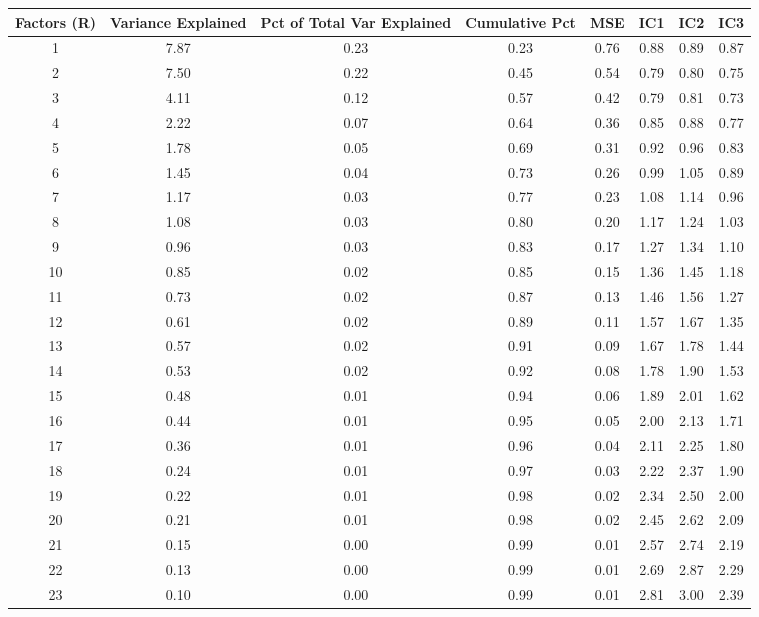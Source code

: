 \documentclass[11pt, letterpaper]{article}\usepackage[]{graphicx}\usepackage[]{color}
\begin{document}
\begin{table}[H]
\centering
\begingroup\scriptsize
\begin{tabular}{cccccccc}
  \hline
Factors (R) & Variance Explained & Pct of Total Var Explained & Cumulative Pct & MSE & IC1 & IC2 & IC3 \\ 
  \hline
  1 & 7.87 & 0.23 & 0.23 & 0.76 & 0.88 & 0.89 & 0.87 \\ 
    2 & 7.50 & 0.22 & 0.45 & 0.54 & 0.79 & 0.80 & 0.75 \\ 
    3 & 4.11 & 0.12 & 0.57 & 0.42 & 0.79 & 0.81 & 0.73 \\ 
    4 & 2.22 & 0.07 & 0.64 & 0.36 & 0.85 & 0.88 & 0.77 \\ 
    5 & 1.78 & 0.05 & 0.69 & 0.31 & 0.92 & 0.96 & 0.83 \\ 
    6 & 1.45 & 0.04 & 0.73 & 0.26 & 0.99 & 1.05 & 0.89 \\ 
    7 & 1.17 & 0.03 & 0.77 & 0.23 & 1.08 & 1.14 & 0.96 \\ 
    8 & 1.08 & 0.03 & 0.80 & 0.20 & 1.17 & 1.24 & 1.03 \\ 
    9 & 0.96 & 0.03 & 0.83 & 0.17 & 1.27 & 1.34 & 1.10 \\ 
   10 & 0.85 & 0.02 & 0.85 & 0.15 & 1.36 & 1.45 & 1.18 \\ 
   11 & 0.73 & 0.02 & 0.87 & 0.13 & 1.46 & 1.56 & 1.27 \\ 
   12 & 0.61 & 0.02 & 0.89 & 0.11 & 1.57 & 1.67 & 1.35 \\ 
   13 & 0.57 & 0.02 & 0.91 & 0.09 & 1.67 & 1.78 & 1.44 \\ 
   14 & 0.53 & 0.02 & 0.92 & 0.08 & 1.78 & 1.90 & 1.53 \\ 
   15 & 0.48 & 0.01 & 0.94 & 0.06 & 1.89 & 2.01 & 1.62 \\ 
   16 & 0.44 & 0.01 & 0.95 & 0.05 & 2.00 & 2.13 & 1.71 \\ 
   17 & 0.36 & 0.01 & 0.96 & 0.04 & 2.11 & 2.25 & 1.80 \\ 
   18 & 0.24 & 0.01 & 0.97 & 0.03 & 2.22 & 2.37 & 1.90 \\ 
   19 & 0.22 & 0.01 & 0.98 & 0.02 & 2.34 & 2.50 & 2.00 \\ 
   20 & 0.21 & 0.01 & 0.98 & 0.02 & 2.45 & 2.62 & 2.09 \\ 
   21 & 0.15 & 0.00 & 0.99 & 0.01 & 2.57 & 2.74 & 2.19 \\ 
   22 & 0.13 & 0.00 & 0.99 & 0.01 & 2.69 & 2.87 & 2.29 \\ 
   23 & 0.10 & 0.00 & 0.99 & 0.01 & 2.81 & 3.00 & 2.39 \\ 

\end{tabular}
\end{table}
\end{document}
